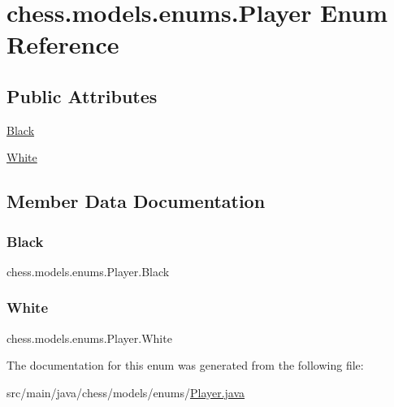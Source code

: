 \hypertarget{enumchess_1_1models_1_1enums_1_1_player}{}\section{chess.\+models.\+enums.\+Player Enum Reference}
\label{enumchess_1_1models_1_1enums_1_1_player}
\subsection*{Public Attributes}
\begin{DoxyCompactItemize}
\item 
\mbox{\hyperlink{enumchess_1_1models_1_1enums_1_1_player_a37677111d3c5ecaf7109ebe257b7d756}{Black}}
\item 
\mbox{\hyperlink{enumchess_1_1models_1_1enums_1_1_player_a60ced79fc80ec46a6a2a6f031b27b08e}{White}}
\end{DoxyCompactItemize}


\subsection{Member Data Documentation}
\mbox{\label{enumchess_1_1models_1_1enums_1_1_player_a37677111d3c5ecaf7109ebe257b7d756}} 
\subsubsection{\texorpdfstring{Black}{Black}}
{\footnotesize\ttfamily chess.\+models.\+enums.\+Player.\+Black}

\mbox{\label{enumchess_1_1models_1_1enums_1_1_player_a60ced79fc80ec46a6a2a6f031b27b08e}} 
\subsubsection{\texorpdfstring{White}{White}}
{\footnotesize\ttfamily chess.\+models.\+enums.\+Player.\+White}



The documentation for this enum was generated from the following file\+:\begin{DoxyCompactItemize}
\item 
src/main/java/chess/models/enums/\mbox{\hyperlink{_player_8java}{Player.\+java}}\end{DoxyCompactItemize}
